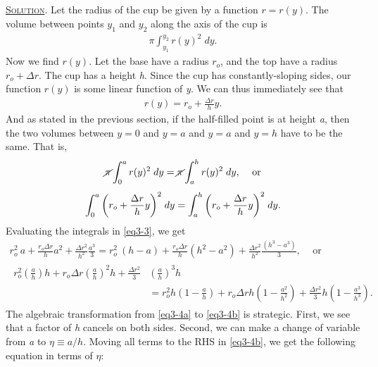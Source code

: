 \documentclass[11pt]{article}
\begin{document}
\subsection[Solution]{} \textsc{\underline{Solution}}. Let the radius of the cup be given by a function $r = r(y)$. The volume between points $y_1$ and $y_2$ along the axis of the cup is
\begin{align} \label{eq3-1}
\pi \int_{y_1}^{y_2}{r(y)^2}\; dy.
\end{align}
Now we find $r(y)$. Let the base have a radius $r_o$, and the top have a radius $r_o + \Delta r$. The cup has a height \textit{h}. Since the cup has constantly-sloping sides, our function $r(y)$ is some linear function of \textit{y}. We can thus immediately see that
\begin{align} \label{eq3-2}
r(y) = r_o + \frac{\Delta r}{h} y.
\end{align}
And as stated in the previous section, if the half-filled point is at height \textit{a}, then the two volumes between $y=0$ and $y=a$ and $y=a$ and $y=h$ have to be the same. That is,
\begin{gather}
\cancel{\pi} \int_{0}^{a}{r(y)^2}\; dy = \cancel{\pi} \int_{a}^{h}{r(y)^2}\; dy, \; \; \; \text{ or}\nonumber \\[0.4em]
 \label{eq3-3} \int_{0}^{a}{\left(r_o + \frac{\Delta r}{h} y \right)^2}\; dy = \int_{a}^{h}{\left(r_o + \frac{\Delta r}{h} y \right)^2}\; dy.
\end{gather}
Evaluating the integrals in \eqref{eq3-3}, we get
\begin{subequations}
\begin{gather}
\label{eq3-4a} r_o^2 \:a + \frac{r_o \Delta r}{h} a^2 + \frac{\Delta r^2}{h^2} \frac{a^3}{3} = r_o^2\: (h-a) + \frac{r_o \Delta r}{h} (h^2-a^2) + \frac{\Delta r^2}{h^2} \frac{(h^3-a^3)}{3}, \; \; \; \text{ or} \\[0.4em]
\label{eq3-4b} \begin{align} 
r_o^2 \left(\frac{a}{h}\right) h + r_o \Delta r \left(\frac{a}{h}\right)^2 h + \frac{\Delta r^2}{3} &\left(\frac{a}{h}\right)^3 h \nonumber \\[0.4em]
&= r_o^2 h\left(1 - \frac{a}{h}\right) + r_o \Delta r h\left(1-\frac{a^2}{h^2}\right) + \frac{\Delta r^2}{3} h\left(1-\frac{a^3}{h^3}\right).
\end{align}
\end{gather}
\end{subequations}
The algebraic transformation from \eqref{eq3-4a} to \eqref{eq3-4b} is strategic. First, we see that a factor of \textit{h} cancels on both sides. Second, we can make a change of variable from \textit{a} to $\eta \equiv a/h$. Moving all terms to the RHS in \eqref{eq3-4b}, we get the following equation in terms of $\eta$:
\end{document}
